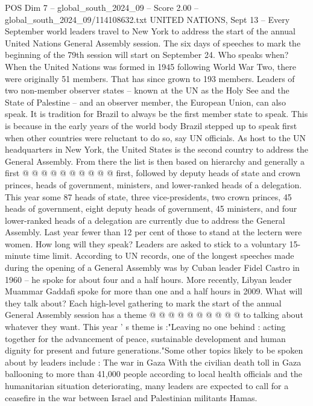 \begin{textsample}{POS Dim 7 – global\_south\_2024\_09 – Score 2.00 – global\_south\_2024\_09/114108632.txt}  \label{ex:f7_pos_275}
UNITED NATIONS, Sept 13 -- Every September world leaders travel to New York to address the start of the annual United Nations General Assembly session.
The six days of speeches to mark the beginning of the 79th session will start on September 24.
Who speaks when?
When the United Nations was formed in 1945 following World War Two, there were originally 51 members.
That has since grown to 193 members.
Leaders of two non-member observer states -- known at the UN as the Holy See and the State of Palestine -- and an observer member, the European Union, can also speak.
It is tradition for Brazil to always be the first member state to speak.
This is because in the early years of the world body Brazil stepped up to speak first when other countries were reluctant to do so, say UN officials.
As host to the UN headquarters in New York, the United States is the second country to address the General Assembly.
From there the list is then based on hierarchy and generally a first @ @ @ @ @ @ @ @ @ @ first, followed by deputy heads of state and crown princes, heads of government, ministers, and lower-ranked heads of a delegation.
This year some 87 heads of state, three vice-presidents, two crown princes, 45 heads of government, eight deputy heads of government, 45 ministers, and four lower-ranked heads of a delegation are currently due to address the General Assembly.
Last year fewer than 12 per cent of those to stand at the lectern were women.
How long will they speak?
Leaders are asked to stick to a voluntary 15-minute time limit.
According to UN records, one of the longest speeches made during the opening of a General Assembly was by Cuban leader Fidel Castro in 1960 -- he spoke for about four and a half hours.
More recently, Libyan leader Muammar Gaddafi spoke for more than one and a half hours in 2009.
What will they talk about?
Each high-level gathering to mark the start of the annual General Assembly session has a theme @ @ @ @ @ @ @ @ @ @ to talking about whatever they want.
This year ' s theme is :"Leaving no one behind : acting together for the advancement of peace, sustainable development and human dignity for present and future generations."Some other topics likely to be spoken about by leaders include : The war in Gaza With the civilian death toll in Gaza ballooning to more than 41,000 people according to local health officials and the humanitarian situation deteriorating, many leaders are expected to call for a ceasefire in the war between Israel and Palestinian militants Hamas.

\end{textsample}
